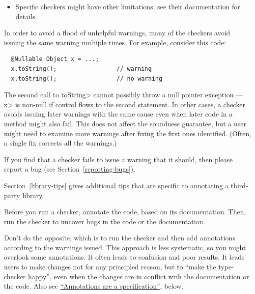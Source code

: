 \begin{itemize}
\item
  Specific checkers might have other limitations; see their documentation for
  details.

\end{itemize}

In order to avoid a flood of unhelpful warnings, many of the checkers avoid
issuing the same warning multiple times.  For example, consider this code:

\begin{Verbatim}
  @Nullable Object x = ...;
  x.toString();                 // warning
  x.toString();                 // no warning
\end{Verbatim}

\noindent
The second call to \<toString> cannot possibly throw a null
pointer exception --- \<x> is non-null if control flows to the second
statement.
In other cases, a checker avoids issuing later warnings with the same cause
even when later code in a method might also fail.
This does not
affect the soundness guarantee, but a user might need to examine more
warnings after fixing the first ones identified.  (Often,
a single fix corrects all the warnings.)


If you find that a checker fails to issue a warning that it
should, then please report a bug (see Section~\ref{reporting-bugs}).



Section~\ref{library-tips} gives additional tips that are
specific to annotating a third-party library.



Before you run a checker, annotate the code, based on its documentation.
Then, run the checker to uncover bugs in the code or the documentation.

Don't do the opposite, which is to run the checker and then add annotations
according to the warnings issued.  This approach is less systematic, so you
might overlook some annotations.  It often leads to confusion and poor
results.  It leads users to make changes not for any principled reason, but
to ``make the type-checker happy'', even when the changes are in conflict
with the documentation or the code.  Also see
\hyperref[get-started-annotations-are-a-specification]{``Annotations are a
  specification''}, below.


